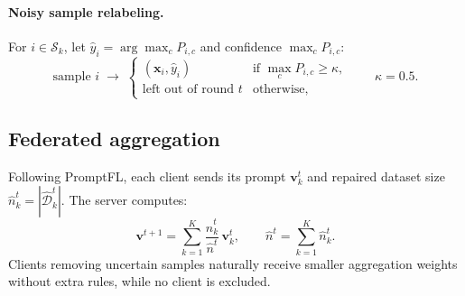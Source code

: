 \documentclass[runningheads]{llncs}
\begin{document}
\paragraph{Noisy sample relabeling.}
\label{sec:correct}
For $i \in \mathcal{S}_k$, let $\hat{y}_i = \arg\max_c P_{i,c}$ and confidence $\max_c P_{i,c}$:
\begin{equation}
\text{sample } i \;\rightarrow\;
\begin{cases}
(\mathbf{x}_i, \hat{y}_i) & \text{if } \max_c P_{i,c} \ge \kappa, \\[2pt]
\text{left out of round } t & \text{otherwise},
\end{cases}
\qquad \kappa = 0.5 .
\label{eq:correct}
\end{equation}

\subsection{Federated aggregation}
\label{sec:agg}
Following PromptFL, each client sends its prompt $\mathbf{v}^{t}_k$ and repaired dataset size $\hat{n}^{t}_k = |\hat{\mathcal{D}}^{t}_k|$. The server computes:
\begin{equation}
\mathbf{v}^{t+1} = \sum_{k=1}^{K} \frac{\hat{n}^{t}_k}{\hat{n}^{t}}\, \mathbf{v}^{t}_k,
\qquad \hat{n}^{t} = \sum_{k=1}^{K} \hat{n}^{t}_k .
\label{eq:agg}
\end{equation}
Clients removing uncertain samples naturally receive smaller aggregation weights without extra rules, while no client is excluded.
\end{document}
